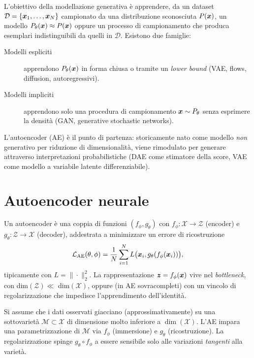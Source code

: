 L'obiettivo della modellazione generativa è apprendere, da un dataset $\mathcal{D} = \{\bm{x}_1, \dots, \bm{x}_N\}$ campionato da una distribuzione sconosciuta $P(\bm{x})$, un modello $P_\theta(\bm{x}) \approx P(\bm{x})$ oppure un processo di campionamento che produca esemplari indistinguibili da quelli in $\mathcal{D}$. Esistono due famiglie:
\begin{description}
  \item[Modelli espliciti] apprendono $P_\theta(\bm{x})$ in forma chiusa o tramite un \emph{lower bound} (VAE, flows, diffusion, autoregressivi).
  \item[Modelli impliciti] apprendono solo una procedura di campionamento $\bm{x} \sim P_\theta$ senza esprimere la densità (GAN, generative stochastic networks).
\end{description}

L'autoencoder (AE) è il punto di partenza: storicamente nato come modello \emph{non} generativo per riduzione di dimensionalità, viene rimodulato per generare attraverso interpretazioni probabilistiche (DAE come stimatore della score, VAE come modello a variabile latente differenziabile).

\section{Autoencoder neurale}

\begin{definition}[Autoencoder]
Un autoencoder è una coppia di funzioni $(f_\phi, g_\theta)$ con $f_\phi: \mathcal{X} \to \mathcal{Z}$ (encoder) e $g_\theta: \mathcal{Z} \to \mathcal{X}$ (decoder), addestrata a minimizzare un errore di ricostruzione
\[
\mathcal{L}_{\text{AE}}(\theta,\phi) = \frac{1}{N}\sum_{i=1}^N L\big(\bm{x}_i, g_\theta(f_\phi(\bm{x}_i))\big),
\]
tipicamente con $L = \|\cdot\|_2^2$. La rappresentazione $\bm{z} = f_\phi(\bm{x})$ vive nel \emph{bottleneck}, con dim$(\mathcal{Z}) \ll$ dim$(\mathcal{X})$, oppure (in AE sovracompleti) con un vincolo di regolarizzazione che impedisce l'apprendimento dell'identità.
\end{definition}

\begin{remark}
Si assume che i dati osservati giacciano (approssimativamente) su una sottovarietà $\mathcal{M} \subset \mathcal{X}$ di dimensione molto inferiore a $\dim(\mathcal{X})$. L'AE impara una parametrizzazione di $\mathcal{M}$ via $f_\phi$ (immersione) e $g_\theta$ (ricostruzione). La regolarizzazione spinge $g_\theta \circ f_\phi$ a essere sensibile solo alle variazioni \emph{tangenti} alla varietà.
\end{remark}

